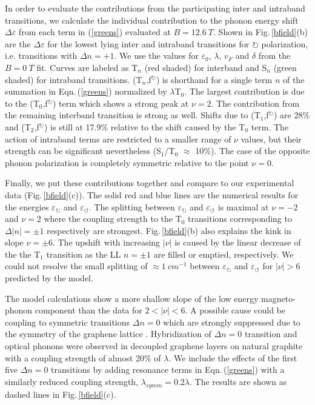 \documentclass[prl,aps,superscriptaddress,showpacs,reprint]{revtex4-1}
\begin{document}
In order to evaluate the contributions from  the participating inter and intraband transitions, we calculate the individual contribution to the phonon energy shift $\Delta\varepsilon$ from each term in (\ref{greens}) evaluated at $B=12.6\: T$. Shown in Fig.\,\ref{bfield}(b) are the $\Delta\varepsilon$ for the lowest lying inter and intraband transitions for $\circlearrowright$ polarization, i.e. transitions with $\Delta n =+1$. We use the values for $\varepsilon_0$, $\lambda$, $v_F$ and $\delta$ from the $B=0\: T$ fit. Curves are labeled as T$_n$ (red shaded) for interband and S$_n$ (green shaded) for intraband transitions. (T$_n$,f$^\circlearrowright$) is shorthand for a single term $n$ of the summation in Eqn.\,(\ref{greens}) normalized by $\lambda$T$_0$. The largest contribution is due to the (T$_0$,f$^\circlearrowright$) term which shows a strong peak at $\nu=2$. The contribution from the remaining interband transition is strong as well. Shifts due to (T$_1$,f$^\circlearrowright$) are 28\% and (T$_2$,f$^\circlearrowright$) is still at 17.9\% relative to the shift caused by the T$_0$ term.
The action of intraband terms are restricted to a smaller range of $\nu$ values, but their strength can be significant nevertheless (S$_1$/T$_0$ $\approx$ 10\%). The case of the opposite phonon polarization is completely symmetric relative to the point $\nu = 0$.

Finally,  we put these contributions together and compare to our experimental data (Fig.\,\ref{bfield}(c)). The solid red and blue lines are the numerical results for the energies $\varepsilon_\circlearrowright$ and $\varepsilon_\circlearrowleft$.
The splitting between $\varepsilon_\circlearrowright$ and $\varepsilon_\circlearrowleft$ is maximal at $\nu=-2$ and $\nu=2$ where the coupling strength to the T$_0$ transitions corresponding to $\Delta|n|=\pm1$ respectively are strongest. Fig.\,\ref{bfield}(b) also explains the kink in slope $\nu=\pm6$.  The upshift with increasing $|\nu|$  is  caused by the linear decrease of the the T$_1$ transition as the LL $n=\pm1 $ are filled or emptied, respectively. We could not resolve the small splitting of $\approx 1\: cm^{-1}$ between $\varepsilon_\circlearrowright$ and $\varepsilon_\circlearrowleft$ for $\left|\nu\right|>6$ predicted by the model.

The model calculations show a more shallow slope of the low energy magneto-phonon component than the data for $2 < \left|\nu\right| < 6$. A possible cause could be coupling to symmetric transitions $\Delta n = 0$ which are strongly suppressed due to the symmetry of the graphene lattice \cite{PhysRevB.84.235138}. Hybridization of $\Delta n =0$ transition and optical phonons were observed in decoupled graphene layers on natural graphite \cite{faugeras2011magneto,kuhne2012polarization} with a coupling strength of almost 20\% of $\lambda$. We include the effects of the first five $\Delta n = 0$ transitions by adding resonance terms in Eqn.\,(\ref{greens}) with a similarly reduced coupling strength, $\lambda_{symm} =0.2\lambda$. The results are shown as dashed lines in Fig.\,\ref{bfield}(c).
\end{document}
